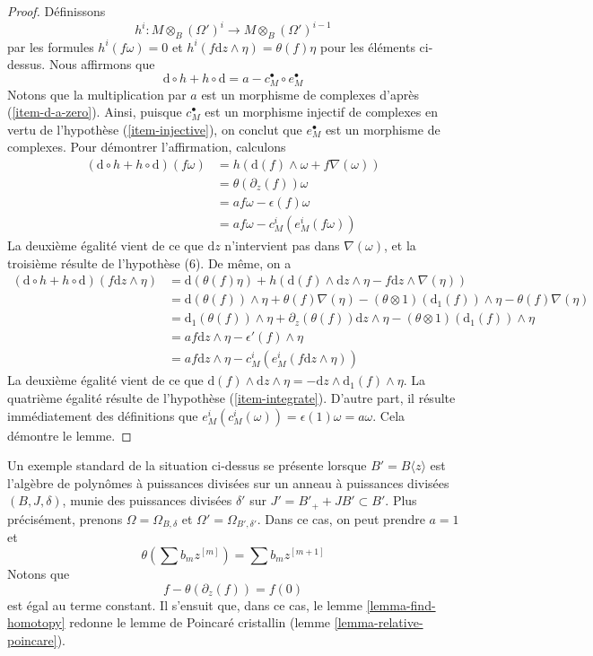 \begin{proof}
\medskip\noindent
Définissons
$$
h^i : M \otimes_B (\Omega')^i \longrightarrow M \otimes_B (\Omega')^{i - 1}
$$
par les formules $h^i(f \omega) = 0$ et
$h^i(f \text{d}z \wedge \eta) = \theta(f) \eta$
pour les éléments ci-dessus. Nous affirmons que
$$
\text{d} \circ h + h \circ \text{d} = a - c_M^\bullet \circ e_M^\bullet
$$
Notons que la multiplication par $a$ est un morphisme de complexes
d'après (\ref{item-d-a-zero}). Ainsi, puisque $c_M^\bullet$ est un morphisme injectif
de complexes en vertu de l'hypothèse (\ref{item-injective}), on conclut que
$e_M^\bullet$ est un morphisme de complexes. Pour démontrer l'affirmation, calculons
\begin{align*}
(\text{d} \circ h + h \circ \text{d})(f \omega)
& =
h\left(\text{d}(f) \wedge \omega + f \nabla(\omega)\right)
\\
& =
\theta(\partial_z(f)) \omega
\\
& =
a f\omega - \epsilon(f)\omega 
\\
& =
a f \omega - c^i_M(e^i_M(f\omega))
\end{align*}
La deuxième égalité vient de ce que $\text{d}z$ n'intervient pas dans $\nabla(\omega)$,
et la troisième résulte de l'hypothèse (6). De même, on a
\begin{align*}
(\text{d} \circ h + h \circ \text{d})(f \text{d}z \wedge \eta)
& =
\text{d}(\theta(f) \eta) +
h\left(\text{d}(f) \wedge \text{d}z \wedge \eta -
f \text{d}z \wedge \nabla(\eta)\right)
\\
& =
\text{d}(\theta(f)) \wedge \eta + \theta(f) \nabla(\eta)
- (\theta \otimes 1)(\text{d}_1(f)) \wedge \eta
- \theta(f) \nabla(\eta)
\\
& =
\text{d}_1(\theta(f)) \wedge \eta +
\partial_z(\theta(f)) \text{d}z \wedge \eta -
(\theta \otimes 1)(\text{d}_1(f)) \wedge \eta
\\
& =
a f \text{d}z \wedge \eta - \epsilon'(f) \wedge \eta \\
& = a f \text{d}z \wedge \eta - c^i_M(e^i_M(f \text{d}z \wedge \eta))
\end{align*}
La deuxième égalité vient de ce que
$\text{d}(f) \wedge \text{d}z \wedge \eta =
- \text{d}z \wedge \text{d}_1(f) \wedge \eta$.
La quatrième égalité résulte de l'hypothèse (\ref{item-integrate}).
D'autre part, il résulte immédiatement des définitions
que $e^i_M(c^i_M(\omega)) = \epsilon(1) \omega = a \omega$.
Cela démontre le lemme.
\end{proof}

\begin{example}
\label{example-integrate}
Un exemple standard de la situation ci-dessus se présente lorsque
$B' = B\langle z \rangle$ est l'algèbre de polynômes à puissances divisées
sur un anneau à puissances divisées $(B, J, \delta)$, munie des puissances divisées
$\delta'$ sur $J' = B'_{+} + JB' \subset B'$. Plus précisément, prenons
$\Omega = \Omega_{B, \delta}$ et $\Omega' = \Omega_{B', \delta'}$.
Dans ce cas, on peut prendre $a = 1$ et
$$
\theta( \sum b_m z^{[m]} ) = \sum b_m z^{[m + 1]}
$$
Notons que
$$
f - \theta(\partial_z(f)) = f(0)
$$
est égal au terme constant. Il s'ensuit que, dans ce cas, le
lemme \ref{lemma-find-homotopy}
redonne le lemme de Poincar\'e cristallin
(lemme \ref{lemma-relative-poincare}).
\end{example}

